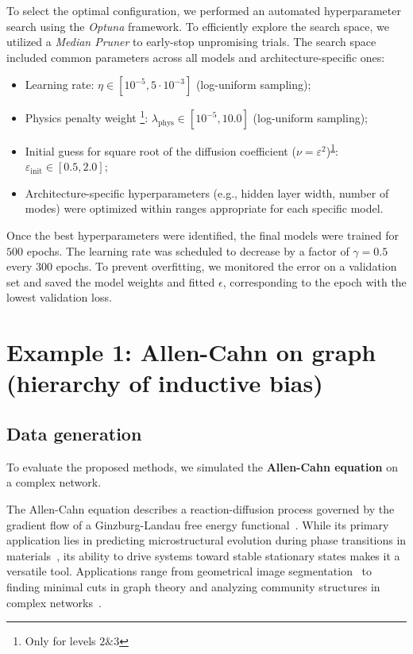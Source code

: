 To select the optimal configuration, we performed an automated hyperparameter search using the \textit{Optuna} framework. To efficiently explore the search space, we utilized a \textit{Median Pruner} to early-stop unpromising trials. The search space included common parameters across all models and architecture-specific ones:
\begin{itemize}
    \item Learning rate: $\eta \in [10^{-5}, 5\cdot 10^{-3}]$ (log-uniform sampling);
    \item Physics penalty weight \footnote{Only for levels $2\&3$\label{fn:levels}}: $\lambda_{\text{phys}} \in [10^{-5}, 10.0]$ (log-uniform sampling);
    \item Initial guess for square root of the diffusion coefficient ($\nu= \varepsilon^2$)\textsuperscript{\ref{fn:levels}}: $\varepsilon_{\text{init}} \in [0.5, 2.0]$;
    \item Architecture-specific hyperparameters (e.g., hidden layer width, number of modes) were optimized within ranges appropriate for each specific model.
\end{itemize}

Once the best hyperparameters were identified, the final models were trained for $500$ epochs. The learning rate was scheduled to decrease by a factor of $\gamma = 0.5$ every $300$ epochs. 
To prevent overfitting, we monitored the error on a validation set and saved the model weights and fitted $\epsilon$, corresponding to the epoch with the lowest validation loss.

\section{Example 1: Allen-Cahn on graph (hierarchy of inductive bias)}

\subsection{Data generation}
To evaluate the proposed methods, we simulated the \textbf{Allen-Cahn equation} on a complex network. 

The Allen-Cahn equation describes a reaction-diffusion process governed by the gradient flow of a Ginzburg-Landau free energy functional~\cite{allen1979microscopic}.
 While its primary application lies in predicting microstructural evolution during phase transitions in materials~\cite{chen2002phase},
  its ability to drive systems toward stable stationary states makes it a versatile tool. 
  Applications range from geometrical image segmentation~\cite{benes2004geometrical} to finding minimal cuts in graph theory and analyzing community structures
   in complex networks~\cite{bertozzi2012diffuse}.
